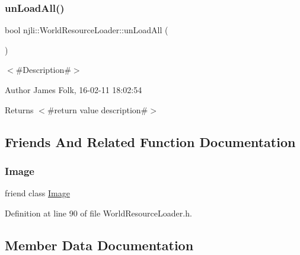 \subsubsection{\texorpdfstring{un\+Load\+All()}{unLoadAll()}}
{\footnotesize\ttfamily bool njli\+::\+World\+Resource\+Loader\+::un\+Load\+All (\begin{DoxyParamCaption}{ }\end{DoxyParamCaption})}



$<$\#\+Description\#$>$ 

\begin{DoxyAuthor}{Author}
James Folk, 16-\/02-\/11 18\+:02\+:54
\end{DoxyAuthor}
\begin{DoxyReturn}{Returns}
$<$\#return value description\#$>$ 
\end{DoxyReturn}


\subsection{Friends And Related Function Documentation}
\mbox{\label{classnjli_1_1_world_resource_loader_a5d6b29a75202aeeaef335faca9eb55e2}} 
\subsubsection{\texorpdfstring{Image}{Image}}
{\footnotesize\ttfamily friend class \mbox{\hyperlink{classnjli_1_1_image}{Image}}\hspace{0.3cm}{\ttfamily [friend]}}



Definition at line 90 of file World\+Resource\+Loader.\+h.



\subsection{Member Data Documentation}
\mbox{\label{classnjli_1_1_world_resource_loader_a5ad02c4c153927307e320b0634b8e989}} 
